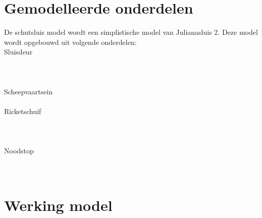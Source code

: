 \documentclass{article}
\begin{document}

\newpage
\section {Gemodelleerde onderdelen}
    De schutsluis model wordt een simplistische model van Julianasluis 2. Deze model
    wordt opgebouwd uit volgende onderdelen: \\

    \noindent Sluisdeur \\\\
    \noindent{} \\
    \\ Scheepvaartsein \\
    \noindent{} \\
    
    \newpage
    \noindent Ricketschuif \\\\
    \noindent{} \\
    \\ Noodstop \\\\
    \noindent{} \\



\newpage
\section {Werking model}
\noindent
{}
\end{document}
